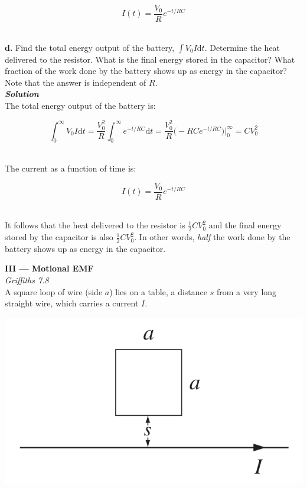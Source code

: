\documentclass[9pt]{extarticle}
\newcommand{\bfit}[1]{\textbf{\textit{#1}}}
\renewcommand{\d}{\text{d}}
\begin{document}
\begin{multicols*}{2}
$$I(t) = \frac{V_0}{R} e^{-t/RC}$$ \ 



\dotfill 

\hfill 

{\Large \bf d.} Find the total energy output of the battery, $\int V_0 I \d t$. Determine the heat delivered to the resistor. What is the final energy stored in the capacitor? What fraction of the work done by the battery shows up as energy in the capacitor? Note that the answer is independent of $R$. \\ 

{\bfit{Solution}} \\ 

The total energy output of the battery is:

$$\int_0^\infty V_0 I \d t = \frac{V_0^2}{R} \int_0^\infty e^{-t/RC} \d t = \frac{V_0^2}{R} \big( -RC e^{-t/RC} \big) \bigg|_0^\infty = CV_0^2$$ \ 

The current as a function of time is:

$$I(t) = \frac{V_0}{R} e^{-t/RC}$$ \ 

It follows that the heat delivered to the resistor is $\frac 12 CV_0^2$ and the final energy stored by the capacitor is also $\frac 12 CV_0^2$. In other words, {\it half} the work done by the battery shows up as energy in the capacitor. \\ 








\hrulefill 

\hfill 

{\LARGE \bf III --- Motional EMF} \\ 

{\it Griffiths 7.8} \\ 

A square loop of wire (side $a$) lies on a table, a distance $s$ from a very long straight wire, which carries a current $I$. \\  

\begin{center}
        \includegraphics[scale=0.3]{ps7-pic3.png}
\end{center}


\end{multicols*}
\end{document}
